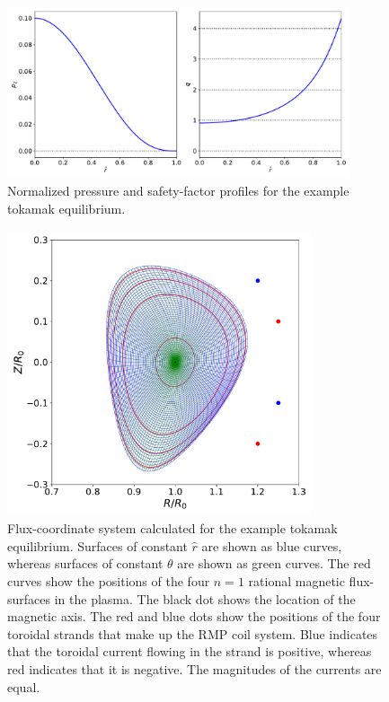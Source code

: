 \documentclass[12pt,prb,aps]{revtex4-1}
\begin{document}
\begin{figure}
\centerline{\includegraphics[width=0.9\textwidth]{Figure1.pdf}}
\caption{Normalized pressure and safety-factor profiles for the example tokamak equilibrium.}\label{f1}
\end{figure}

\begin{figure}
\centerline{\includegraphics[width=0.8\textwidth]{Figure2.pdf}}
\caption{Flux-coordinate system calculated for the example tokamak equilibrium. Surfaces of constant $\hat{r}$ are shown as
blue curves, whereas surfaces of constant $\theta$ are shown as green curves. The red curves show the positions of the
four $n=1$ rational magnetic flux-surfaces in the plasma. The black dot shows the location of the magnetic axis. The
red and blue dots show the positions of the four toroidal strands that make up the RMP coil system. Blue indicates that the toroidal
current flowing in the strand is positive, whereas red indicates that it is negative. The magnitudes of the currents are equal.}\label{f2}
\end{figure}
\end{document}
